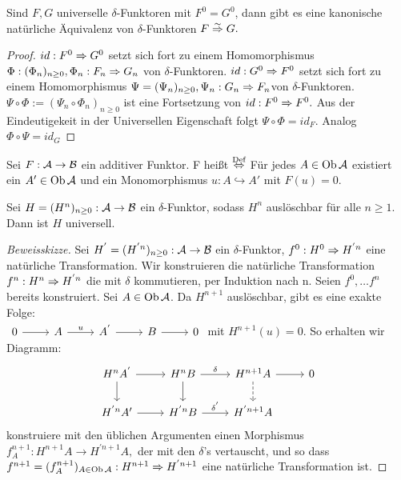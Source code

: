 \begin{bem}\label{9.4}
	Sind $F,G$ universelle $\delta$-Funktoren mit $F^{0} = G^{0}$, dann gibt es eine kanonische natürliche Äquivalenz von $\delta$-Funktoren $ F \overset{\sim}{\Rightarrow} G.$
\end{bem}
\begin{proof}
	$id: F^{0} \Rightarrow G^{0} $ setzt sich fort zu einem Homomorphismus $\Phi: (\Phi_n)_{n \geq 0}, \Phi_n: F_n \Rightarrow G_n $ von $\delta$-Funktoren. $id: G^{0} \Rightarrow F^{0} $ setzt sich fort zu einem Homomorphismus $\Psi = (\Psi_n)_{n \geq 0}, \Psi_n: G_n\Rightarrow F_n $von $\delta$-Funktoren. $\Psi \circ \Phi := (\Psi_n \circ \Phi_n)_{n \geq 0}$ ist eine Fortsetzung von $id: F^{0} \Rightarrow F^{0}.$ Aus der Eindeutigekeit in der Universellen Eigenschaft folgt $\Psi \circ \Phi = id_F.$ Analog $ \Phi \circ \Psi = id_G$
\end{proof}
\begin{df}\label{9.5}
	Sei $ F: \mathcal{A} \to \mathcal{B} $ ein additiver Funktor.  F heißt  $\overset{\text{Def}}{\Leftrightarrow} $ Für jedes $A \in \text{Ob}\,\mathcal{A} $ existiert ein $A' \in \text{Ob}\,\mathcal{A} $ und ein Monomorphismus $ u: A \hookrightarrow A'$ mit $ F(u)= 0 $. 
\end{df}
\begin{sa}\label{9.6}
	Sei $H=(H^n)_{n\geq 0}: \mathcal{A} \to \mathcal{B} $ ein $\delta$-Funktor, sodass $H^n $ auslöschbar für alle $ n \geq 1$. Dann ist $H$ universell. 
\end{sa}
\begin{proof}[Beweisskizze]
	Sei $H^{'}=(H^{'n})_{n\geq 0}: \mathcal{A} \to \mathcal{B} $ ein $\delta$-Funktor, $f^{0}: H^{0} \Rightarrow H^{'n}$ eine natürliche Transformation. Wir konstruieren die natürliche Transformation $f^n: H^n \Rightarrow H^{'n} $ die mit $\delta$ kommutieren, per Induktion nach n. Seien $f^{0},\dots f^{n}$ bereits konstruiert. Sei $A \in \text{Ob}\,\mathcal{A} $. Da $H^{n+1} $ auslöschbar, gibt es eine exakte Folge:\\ $\begin{tikzcd}
	0\arrow{r} & A \arrow{r}{u} & A^{'}\arrow{r} & B \arrow{r} & 0
	\end{tikzcd}$ mit $H^{n+1}(u) = 0$. So erhalten wir Diagramm: 
	$$\begin{tikzcd}
	H^{n}A^{'}\arrow{d} \arrow{r} & H^{n}B\arrow{r}{\delta} \arrow{d}& H^{n+1}A \arrow[dashed]{d} \arrow{r} & 0\\
	H^{'n}A' \arrow{r} & H^{'n}B\arrow{r}{\delta^{'}} & H^{'n+1}A
	\end{tikzcd} $$
	konstruiere mit den üblichen Argumenten einen Morphismus $f^{n+1}_A : H^{n+1}A \to H^{'n+1}A, $ der mit den $\delta$'s vertauscht, und so dass $f^{n+1} = (f^{n+1}_A)_{A \in \text{Ob}\,\mathcal{A}}:H^{n+1} \Rightarrow H^{'n+1} $ eine natürliche Transformation ist. 
\end{proof}
